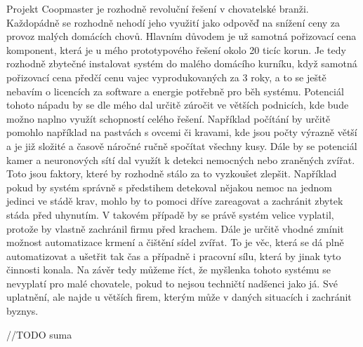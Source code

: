 Projekt Coopmaster je rozhodně revoluční řešení v chovatelské branži.
Každopádně se rozhodně nehodí jeho využití jako odpověď na snížení ceny za provoz malých domácích chovů.
Hlavním důvodem je už samotná pořizovací cena komponent, která je u mého prototypového řešení okolo 20 ticíc korun.
Je tedy rozhodně zbytečné instalovat systém do malého domácího kurníku, když samotná pořizovací cena předčí cenu vajec vyprodukovaných za 3 roky, a to se ještě nebavím o licencích za software a energie potřebně pro běh systému.\newline
Potenciál tohoto nápadu by se dle mého dal určitě zúročit ve větších podnicích, kde bude možno naplno využít schopností celého řešení.
Například počítání by určitě pomohlo například na pastvách s ovcemi či kravami, kde jsou počty výrazně větší a je již složité a časově náročné ručně spočítat všechny kusy.
Dále by se potenciál kamer a neuronových sítí dal využít k detekci nemocných nebo zraněných zvířat.
Toto jsou faktory, které by rozhodně stálo za to vyzkoušet zlepšit.
Například pokud by systém správně s předstihem detekoval nějakou nemoc na jednom jedinci ve stádě krav, mohlo by to pomoci dříve zareagovat a zachránit zbytek stáda před uhynutím.
V takovém případě by se právě systém velice vyplatil, protože by vlastně zachránil firmu před krachem.\newline
Dále je určitě vhodné zmínit možnost automatizace krmení a čištění sídel zvířat.
To je věc, která se dá plně automatizovat a ušetřit tak čas a případně i pracovní sílu, která by jinak tyto činnosti konala.\newline
Na závěr tedy můžeme říct, že myšlenka tohoto systému se nevyplatí pro malé chovatele, pokud to nejsou techničtí nadšenci jako já.
Své uplatnění, ale najde u větších firem, kterým může v daných situacích i zachránit byznys.

//TODO suma



